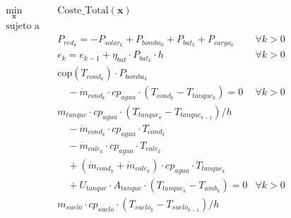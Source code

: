 \begin{align}
	\min_{\mathbf{x}} \quad & \text{Coste\_Total}(\mathbf{x}) \label{eq:sand_control_optimization}                                                                                                               \\
	\text{sujeto a} \quad   & \nonumber                                                                                                                                      \\
	                        & P_{red_k} = -P_{solar_k} + P_{bomba_k} + P_{bat_k} + P_{carga_k} \quad                                                         & \forall k > 0 \\
	                        & e_k = e_{k-1} + \eta_{bat} \cdot P_{bat_k} \cdot h \quad                                                                       & \forall k > 0 \\
	                        & \text{cop}(T_{cond_k}) \cdot P_{bomba_k} \nonumber                                                                                             \\
	                        & \quad - \dot{m}_{cond_k} \cdot cp_{agua} \cdot (T_{cond_k} - T_{tanque_k}) = 0 \label{eq:sys_1_sand}                           & \forall k > 0 \\
	                        & m_{tanque} \cdot cp_{agua} \cdot ( T_{tanque_k} - T_{tanque_{k-1}}) / h  \nonumber                                                             \\
	                        & \quad - \dot{m}_{cond_k} \cdot cp_{agua} \cdot T_{cond_k} \nonumber                                                                            \\
	                        & \quad - \dot{m}_{cale_k} \cdot cp_{agua} \cdot T_{cale_k} \nonumber                                                                            \\
	                        & \quad + (\dot{m}_{cond_k} + \dot{m}_{cale_k}) \cdot cp_{agua} \cdot T_{tanque_k} \nonumber                                                     \\
	                        & \quad + U_{tanque} \cdot A_{tanque} \cdot (T_{tanque_k} - T_{amb_k}) = 0 \label{eq:sys_2_sand}                                 & \forall k > 0 \\
	                        & m_{suelo} \cdot cp_{suelo} \cdot ( T_{suelo_k} - T_{suelo_{k-1}}) / h \nonumber                                                                \\

\end{align}
